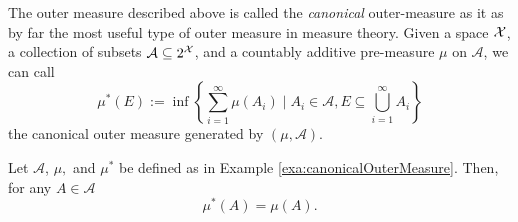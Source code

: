\begin{rem}
The outer measure described above is called the \emph{canonical }outer-measure
as it as by far the most useful type of outer measure in measure theory.
Given a space $\mathcal{X}$, a collection of subsets $\mathcal{A}\subseteq2^{\mathcal{X}}$,
and a countably additive pre-measure $\mu$ on $\mathcal{A}$, we
can call
\[
\mu^{*}\left(E\right):=\inf\left\{ \sum_{i=1}^{\infty}\mu\left(A_{i}\right)\mid A_{i}\in\mathcal{A},E\subseteq\bigcup_{i=1}^{\infty}A_{i}\right\} 
\]
the canonical outer measure generated by $\left(\mu,\mathcal{A}\right)$.
\end{rem}

\begin{prop}
\label{prop:restrictionOfOuterMeasure}Let $\mathcal{A}$, $\mu,$
and $\mu^{*}$ be defined as in Example \ref{exa:canonicalOuterMeasure}.
Then, for any $A\in\mathcal{A}$
\[
\mu^{*}\left(A\right)=\mu\left(A\right).
\]
\end{prop}

